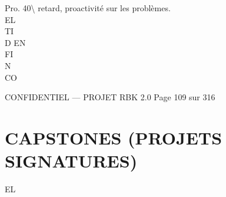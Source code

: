Pro.       40\textbackslash{}%
retard, proactivité sur les problèmes.\\
\vspace{0.5em}
\vspace{0.5em}
\vspace{0.5em}
\vspace{0.5em}
EL\\
TI\\
D    EN\\
FI\\
N\\
CO\\
\vspace{0.5em}
\vspace{0.5em}
\vspace{0.5em}
\vspace{0.5em}
\begin{confidential}CONFIDENTIEL — PROJET RBK 2.0                                      Page 109 sur 316\end{confidential}
\section{CAPSTONES (PROJETS SIGNATURES)}
\vspace{0.5em}
\vspace{0.5em}
\vspace{0.5em}
\vspace{0.5em}
EL\\
